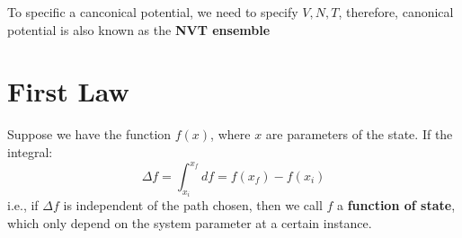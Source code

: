 \documentclass{article}
\begin{document}
To specific a canconical potential, we need to specify $V, N, T$, therefore, canonical potential 
is also known as the \textbf{NVT ensemble}



\section{First Law}
Suppose we have the function $f(x)$, where $x$ are parameters of the state. 
If the integral:
\begin{equation}
    \Delta f = \int_{x_i}^{x_f} df = f(x_f) - f(x_i) 
\end{equation}
i.e., if $\Delta f$ is independent of the path chosen, then we call $f$ a 
\textbf{function of state}, which only depend on the system parameter at a 
certain instance.
\end{document}

